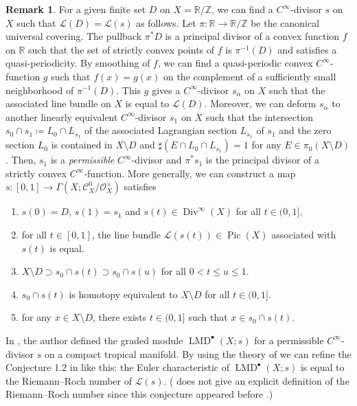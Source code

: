 \documentclass[a4paper,dvipdfmx,reqno,12pt]{amsart}
\theoremstyle{definition}
\newtheorem{remark}[theorem]{Remark}
\newcommand{\deq}{\coloneqq}
\newcommand{\opn}[1]{\operatorname{#1}}
\numberwithin{equation}{section}
\begin{document}
\begin{remark}
For a given finite set $D$ on
$X=\mathbb{R}/\mathbb{Z}$,
we can find a $C^{\infty}$-divisor $s$ on $X$
such that $\mathcal{L}(D)=\mathcal{L}(s)$ as follows.
Let $\pi\colon \mathbb{R}\to \mathbb{R}/\mathbb{Z}$
be the canonical universal covering.
The pullback $\pi^* D$ is a principal divisor 
of a convex function $f$ on $\mathbb{R}$ such that 
the set of strictly convex points of $f$ is $\pi^{-1}(D)$
and satisfies a quasi-periodicity.
By smoothing of $f$, we can find a quasi-periodic
convex $C^{\infty}$-function $g$ such that $f(x)=g(x)$ on 
the complement of a sufficiently 
small neighborhood of $\pi^{-1}(D)$. 
This $g$ gives a $C^{\infty}$-divisor $s_{\alpha}$ on
$X$ such that the associated line bundle on $X$ is equal
to $\mathcal{L}(D)$.
Moreover, we can deform $s_{\alpha}$ to another 
linearly equivalent 
$C^{\infty}$-divisor $s_{1}$ on $X$ such that 
the intersection $s_0\cap s_{1}\deq 
L_{0}\cap L_{s_{1}}$ of the associated 
Lagrangian section $L_{s_{1}}$
of $s_{1}$ and the zero section $L_0$ is contained in 
$X\setminus D$ and $\sharp (E\cap L_{0}\cap L_{s_{1}})=1$
for any $E\in \pi_0(X\setminus D)$.
Then, $s_{1}$ is a \emph{permissible} 
$C^{\infty}$-divisor and $\pi^{*}s_{1}$ is the 
principal divisor of a strictly convex
$C^{\infty}$-function.
More generally,
we can construct a map $s\colon [0,1]\to 
\Gamma (X;\mathcal{C}^{0}_X/\mathcal{O}_X^{\times})$ satisfies
\begin{enumerate}
\item $s(0)=D$, $s(1)=s_1$ and $s(t)\in \opn{Div}^{\infty}(X)$
for all $t\in (0,1]$,
\item for all $t\in [0,1]$, the line bundle
$\mathcal{L}(s(t))\in \opn{Pic}(X)$ associated with
$s(t)$ is equal. 
\item $X\setminus D\supset s_0\cap s(t)\supset s_0\cap s(u)$ for all $0<t\leq u \leq 1$.
\item $s_0\cap s(t)$ is homotopy equivalent to $X\setminus D$
for all $t\in (0,1]$.
\item for any $x\in X\setminus D$, there exists $t\in (0,1]$
such that $x\in s_0\cap s(t)$. 
\end{enumerate}

In \cite{tsutsui2023graded}, the author
defined the graded module $\opn{LMD}^{\bullet}(X;s)$
for a permissible $C^{\infty}$-divisor $s$ on
a compact tropical manifold.
By using the theory of \cite{demedrano2023chern}
we can refine the Conjecture 1.2 in 
\cite{tsutsui2023graded}
like this: the Euler characteristic of
$\opn{LMD}^{\bullet}(X;s)$ 
is equal to the Riemann--Roch number of 
$\mathcal{L}(s)$.
(\cite[Conjecture 1.2]{tsutsui2023graded} does not
give an explicit definition of the Riemann--Roch number
since this conjecture appeared before
\cite{demedrano2023chern}.)



\end{remark}
\end{document}
